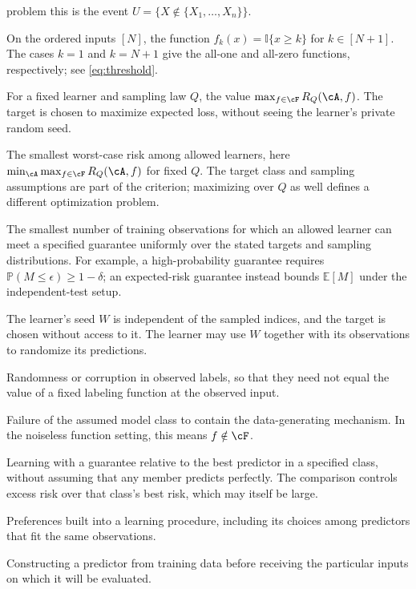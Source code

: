 \documentclass[11pt,twoside]{article}
\newcommand{\I}{\mathbb I}
\renewcommand{\P}{\mathbb P}
\theoremstyle{definition}
\theoremstyle{remark}
\begin{document}
\begin{description}[style=nextline,leftmargin=1.5em,labelindent=0pt]
problem this is the event $U=\{X\notin\{X_1,\ldots,X_n\}\}$.
\item[Threshold target]
On the ordered inputs $[N]$, the function $f_k(x)=\I\{x\ge k\}$ for
$k\in[N+1]$. The cases $k=1$ and $k=N+1$ give the all-one and all-zero
functions, respectively; see \cref{eq:threshold}.
\item[Worst-case risk]
For a fixed learner and sampling law $Q$, the value
$\max_{f\in\cF}R_Q(\cA,f)$. The target is chosen to maximize expected
loss, without seeing the learner's private random seed.
\item[Minimax risk]
The smallest worst-case risk among allowed learners, here
$\min_{\cA}\max_{f\in\cF}R_Q(\cA,f)$ for fixed $Q$.
The target class and sampling assumptions are part of the criterion;
maximizing over $Q$ as well defines a different optimization problem.
\item[Sample complexity]
The smallest number of training observations for which an allowed learner
can meet a specified guarantee uniformly over the stated targets and
sampling distributions. For example, a high-probability guarantee requires
$\P(M\le\epsilon)\ge1-\delta$; an expected-risk guarantee instead bounds
$\mathbb E[M]$ under the independent-test setup.
\item[Private randomization]
The learner's seed $W$ is independent of the sampled indices, and the target
is chosen without access to it. The learner may use $W$ together with its
observations to randomize its predictions.
\item[Label noise]
Randomness or corruption in observed labels, so that they need not equal
the value of a fixed labeling function at the observed input.
\item[Misspecification]
Failure of the assumed model class to contain the data-generating mechanism.
In the noiseless function setting, this means $f\notin\cF$.
\item[Agnostic learning]
Learning with a guarantee relative to the best predictor in a specified
class, without assuming that any member predicts perfectly. The comparison
controls excess risk over that class's best risk, which may itself be large.
\item[Algorithmic bias]
Preferences built into a learning procedure, including its choices among
predictors that fit the same observations.
\item[Inductive learning]
Constructing a predictor from training data before receiving the particular
inputs on which it will be evaluated.
\item[Transductive learning]

\end{description}
\end{document}

